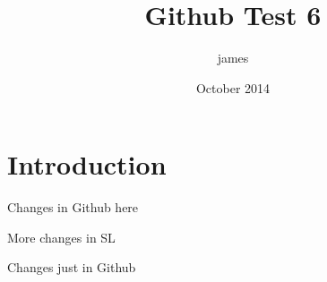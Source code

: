 \documentclass{article}
\title{Github Test 6}
\author{james }
\date{October 2014}
\begin{document}
\maketitle

\section{Introduction}

Changes in Github here

More changes in SL

Changes just in Github
\end{document}
